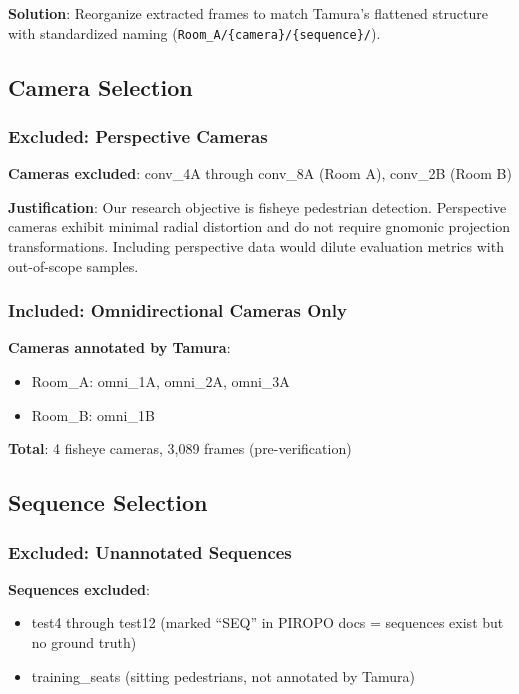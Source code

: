 \documentclass[11pt]{article}
\begin{document}
\textbf{Solution}: Reorganize extracted frames to match Tamura's flattened structure with standardized naming (\texttt{Room\_A/\{camera\}/\{sequence\}/}).

\subsection{Camera Selection}

\subsubsection{Excluded: Perspective Cameras}

\textbf{Cameras excluded}: conv\_4A through conv\_8A (Room A), conv\_2B (Room B)

\textbf{Justification}: Our research objective is fisheye pedestrian detection. Perspective cameras exhibit minimal radial distortion and do not require gnomonic projection transformations. Including perspective data would dilute evaluation metrics with out-of-scope samples.

\subsubsection{Included: Omnidirectional Cameras Only}

\textbf{Cameras annotated by Tamura}:
\begin{itemize}[leftmargin=*]
    \item Room\_A: omni\_1A, omni\_2A, omni\_3A
    \item Room\_B: omni\_1B
\end{itemize}

\textbf{Total}: 4 fisheye cameras, 3,089 frames (pre-verification)

\subsection{Sequence Selection}

\subsubsection{Excluded: Unannotated Sequences}

\textbf{Sequences excluded}:
\begin{itemize}[leftmargin=*]
    \item test4 through test12 (marked ``SEQ'' in PIROPO docs = sequences exist but no ground truth)
    \item training\_seats (sitting pedestrians, not annotated by Tamura)
\end{itemize}
\end{document}
